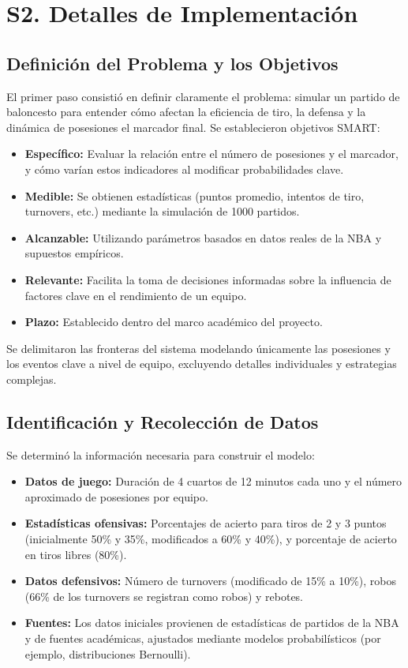 \documentclass[12pt]{article}
\begin{document}
\newpage

\section{S2. Detalles de Implementación}

\subsection{Definición del Problema y los Objetivos}
El primer paso consistió en definir claramente el problema: simular un partido de baloncesto para entender cómo afectan la eficiencia de tiro, la defensa y la dinámica de posesiones el marcador final. Se establecieron objetivos SMART:
\begin{itemize}
    \item \textbf{Específico:} Evaluar la relación entre el número de posesiones y el marcador, y cómo varían estos indicadores al modificar probabilidades clave.
    \item \textbf{Medible:} Se obtienen estadísticas (puntos promedio, intentos de tiro, turnovers, etc.) mediante la simulación de 1000 partidos.
    \item \textbf{Alcanzable:} Utilizando parámetros basados en datos reales de la NBA y supuestos empíricos.
    \item \textbf{Relevante:} Facilita la toma de decisiones informadas sobre la influencia de factores clave en el rendimiento de un equipo.
    \item \textbf{Plazo:} Establecido dentro del marco académico del proyecto.
\end{itemize}
Se delimitaron las fronteras del sistema modelando únicamente las posesiones y los eventos clave a nivel de equipo, excluyendo detalles individuales y estrategias complejas.

\subsection{Identificación y Recolección de Datos}
Se determinó la información necesaria para construir el modelo:
\begin{itemize}
    \item \textbf{Datos de juego:} Duración de 4 cuartos de 12 minutos cada uno y el número aproximado de posesiones por equipo.
    \item \textbf{Estadísticas ofensivas:} Porcentajes de acierto para tiros de 2 y 3 puntos (inicialmente 50\% y 35\%, modificados a 60\% y 40\%), y porcentaje de acierto en tiros libres (80\%).
    \item \textbf{Datos defensivos:} Número de turnovers (modificado de 15\% a 10\%), robos (66\% de los turnovers se registran como robos) y rebotes.
    \item \textbf{Fuentes:} Los datos iniciales provienen de estadísticas de partidos de la NBA y de fuentes académicas, ajustados mediante modelos probabilísticos (por ejemplo, distribuciones Bernoulli).
\end{itemize}
\end{document}
